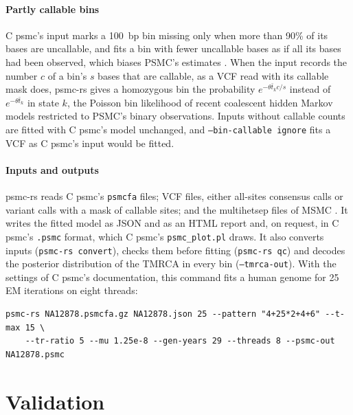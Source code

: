 \documentclass[a4paper,num-refs,gigabyte]{oup-contemporary}%
\newcommand{\psmcrs}{psmc-rs}
\newcommand{\opt}[1]{\texttt{#1}}
\begin{document}
\paragraph{Partly callable bins} C psmc's input marks a 100~bp bin missing only when more than 90\% of its bases are uncallable, and fits a bin with fewer uncallable bases as if all its bases had been observed, which biases PSMC's estimates \citep{lipson2015,nadachowska2016}. When the input records the number $c$ of a bin's $s$ bases that are callable, as a VCF read with its callable mask does, \psmcrs{} gives a homozygous bin the probability $e^{-\theta\bar t_kc/s}$ instead of $e^{-\theta\bar t_k}$ in state $k$, the Poisson bin likelihood of recent coalescent hidden Markov models \citep{cousins2024,cousins2025} restricted to PSMC's binary observations. Inputs without callable counts are fitted with C psmc's model unchanged, and \opt{--bin-callable ignore} fits a VCF as C psmc's input would be fitted.

\paragraph{Inputs and outputs} \psmcrs{} reads C psmc's \texttt{psmcfa} files; VCF files, either all-sites consensus calls or variant calls with a mask of callable sites; and the multihetsep files of MSMC \citep{schiffels2014}. It writes the fitted model as JSON and as an HTML report and, on request, in C psmc's \texttt{.psmc} format, which C psmc's \texttt{psmc\_plot.pl} draws. It also converts inputs (\opt{psmc-rs convert}), checks them before fitting (\opt{psmc-rs qc}) and decodes the posterior distribution of the TMRCA in every bin (\opt{--tmrca-out}). With the settings of C psmc's documentation, this command fits a human genome for 25 EM iterations on eight threads:
\begin{verbatim}
psmc-rs NA12878.psmcfa.gz NA12878.json 25 --pattern "4+25*2+4+6" --t-max 15 \
    --tr-ratio 5 --mu 1.25e-8 --gen-years 29 --threads 8 --psmc-out NA12878.psmc
\end{verbatim}

\section{Validation}
\end{document}
